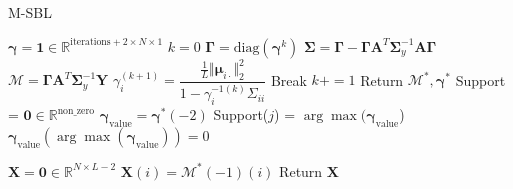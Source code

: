 \begin{algorithm}[H]
\caption{M-SBL}
\begin{algorithmic}[1]
\State $\boldsymbol{\gamma} = \mathbf{1} \in \mathbb{R}^{\text{iterations} + 2 \times N \times 1}$
\State $k = 0$
	\State $\boldsymbol{\Gamma} = \text{diag}(\boldsymbol{\gamma}^k)$
		\State $\boldsymbol{\Sigma} = \boldsymbol{\Gamma} - \boldsymbol{\Gamma} \mathbf{A}^T \boldsymbol{\Sigma}_y^{-1} \mathbf{A} \boldsymbol{\Gamma}$
		\State $\mathcal{M} = \boldsymbol{\Gamma} \mathbf{A}^T \boldsymbol{\Sigma}_y^{-1} \mathbf{Y}$
		\State $\gamma_i^{(k+1)} = \dfrac{\frac{1}{L} \Vert \boldsymbol{\mu}_{i \cdot} \Vert_2^2}{1 - \gamma_i^{-1 (k)} \Sigma_{ii}}$
	\EndFor
		\State Break
	\EndIf
	\State $k += 1$
\EndWhile
\State Return $\mathcal{M}^\ast, \boldsymbol{\gamma}^\ast$
\EndProcedure
{}
\State Support = $\mathbf{0} \in \mathbb{R}^{\text{non\_zero}}$
\State $\boldsymbol{\gamma}_{\text{value}} = \boldsymbol{\gamma}^\ast (-2)$
		\State Support($j$) = $\arg \max (\boldsymbol{\gamma}_{\text{value}}$)
		\State $\boldsymbol{\gamma}_{\text{value}}(\arg \max (\boldsymbol{\gamma}_{\text{value}})) = 0$
	\EndIf

\EndFor
\State $\mathbf{X} = \mathbf{0} \in \mathbb{R}^{N \times L-2}$
	\State $\mathbf{X}(i) = \mathcal{M}^\ast(-1)(i)$
\EndFor
\State Return $\mathbf{X}$
\EndProcedure
\end{algorithmic}
\end{algorithm}

